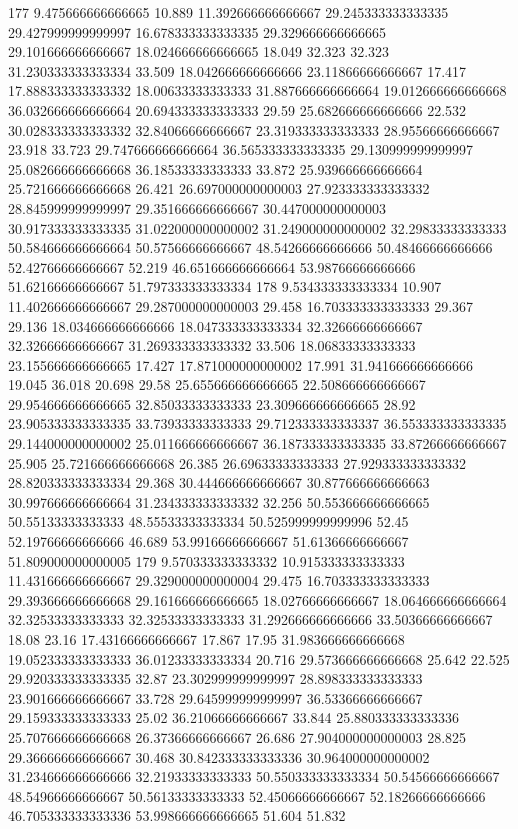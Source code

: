 177 9.475666666666665 10.889 11.392666666666667 29.245333333333335 29.427999999999997 16.678333333333335 29.329666666666665 29.101666666666667 18.024666666666665 18.049 32.323 32.323 31.230333333333334 33.509 18.042666666666666 23.11866666666667 17.417 17.888333333333332 18.00633333333333 31.887666666666664 19.012666666666668 36.032666666666664 20.694333333333333 29.59 25.682666666666666 22.532 30.028333333333332 32.84066666666667 23.319333333333333 28.95566666666667 23.918 33.723 29.747666666666664 36.565333333333335 29.130999999999997 25.082666666666668 36.18533333333333 33.872 25.939666666666664 25.721666666666668 26.421 26.697000000000003 27.923333333333332 28.845999999999997 29.351666666666667 30.447000000000003 30.917333333333335 31.022000000000002 31.249000000000002 32.29833333333333 50.584666666666664 50.57566666666667 48.54266666666666 50.48466666666666 52.42766666666667 52.219 46.651666666666664 53.98766666666666 51.62166666666667 51.797333333333334
178 9.534333333333334 10.907 11.402666666666667 29.287000000000003 29.458 16.703333333333333 29.367 29.136 18.034666666666666 18.047333333333334 32.32666666666667 32.32666666666667 31.269333333333332 33.506 18.06833333333333 23.155666666666665 17.427 17.871000000000002 17.991 31.941666666666666 19.045 36.018 20.698 29.58 25.655666666666665 22.508666666666667 29.954666666666665 32.85033333333333 23.309666666666665 28.92 23.905333333333335 33.73933333333333 29.712333333333337 36.553333333333335 29.144000000000002 25.011666666666667 36.187333333333335 33.87266666666667 25.905 25.721666666666668 26.385 26.69633333333333 27.929333333333332 28.820333333333334 29.368 30.444666666666667 30.877666666666663 30.997666666666664 31.234333333333332 32.256 50.553666666666665 50.55133333333333 48.55533333333334 50.525999999999996 52.45 52.19766666666666 46.689 53.99166666666667 51.61366666666667 51.809000000000005
179 9.570333333333332 10.915333333333333 11.431666666666667 29.329000000000004 29.475 16.703333333333333 29.393666666666668 29.161666666666665 18.02766666666667 18.064666666666664 32.32533333333333 32.32533333333333 31.292666666666666 33.50366666666667 18.08 23.16 17.43166666666667 17.867 17.95 31.983666666666668 19.052333333333333 36.01233333333334 20.716 29.573666666666668 25.642 22.525 29.920333333333335 32.87 23.302999999999997 28.898333333333333 23.901666666666667 33.728 29.645999999999997 36.53366666666667 29.159333333333333 25.02 36.21066666666667 33.844 25.880333333333336 25.707666666666668 26.37366666666667 26.686 27.904000000000003 28.825 29.366666666666667 30.468 30.842333333333336 30.964000000000002 31.234666666666666 32.21933333333333 50.550333333333334 50.54566666666667 48.54966666666667 50.56133333333333 52.45066666666667 52.18266666666666 46.705333333333336 53.998666666666665 51.604 51.832
